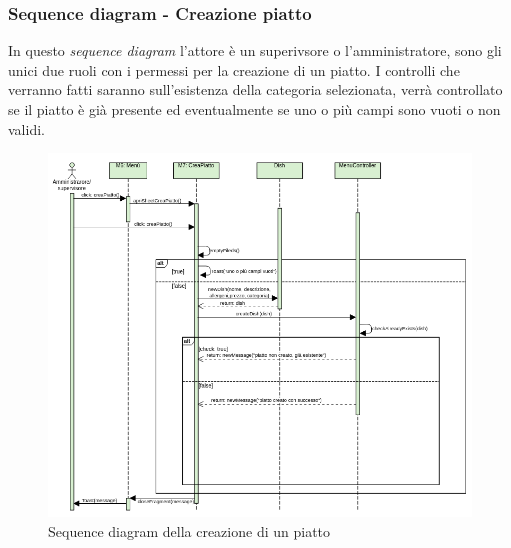\subsubsection{Sequence diagram - Creazione piatto}
In questo \textit{sequence diagram} l'attore è un superivsore o l'amministratore, sono gli unici due ruoli con i permessi per la creazione di un piatto. I controlli che verranno fatti saranno sull'esistenza della categoria selezionata, verrà controllato se il piatto è già presente ed eventualmente se uno o più campi sono vuoti o non validi.
\begin{figure}[H]
  \centering
  \includegraphics[scale=0.8]{img/sequence/creazionePiatto_sequence_diagram.png}
  \caption{Sequence diagram della creazione di un piatto}
\end{figure}

